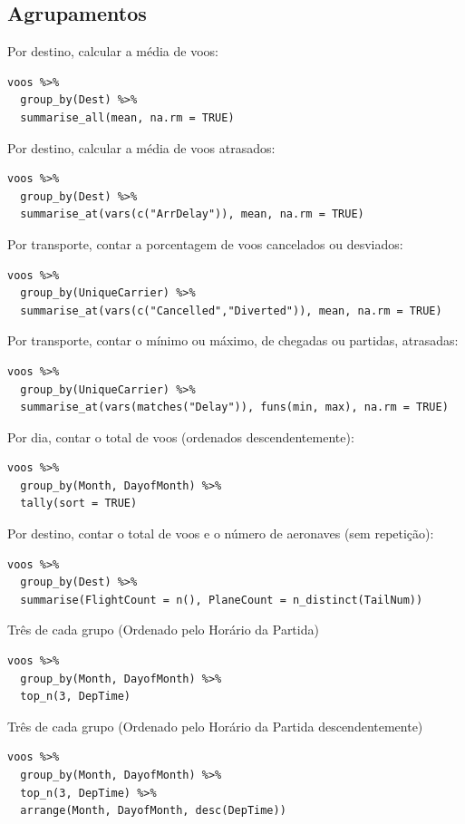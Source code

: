 \documentclass[a4paper,11pt]{article}
\begin{document}
\subsection{Agrupamentos}
Por destino, calcular a média de voos:
\begin{lstlisting}
voos %>%
  group_by(Dest) %>%
  summarise_all(mean, na.rm = TRUE)
\end{lstlisting}

Por destino, calcular a média de voos atrasados:
\begin{lstlisting}
voos %>%
  group_by(Dest) %>%
  summarise_at(vars(c("ArrDelay")), mean, na.rm = TRUE)
\end{lstlisting}

Por transporte, contar a porcentagem de voos cancelados ou desviados:
\begin{lstlisting}
voos %>%
  group_by(UniqueCarrier) %>%
  summarise_at(vars(c("Cancelled","Diverted")), mean, na.rm = TRUE)
\end{lstlisting}

Por transporte, contar o mínimo ou máximo, de chegadas ou partidas, atrasadas:
\begin{lstlisting}
voos %>%
  group_by(UniqueCarrier) %>%
  summarise_at(vars(matches("Delay")), funs(min, max), na.rm = TRUE)
\end{lstlisting}

Por dia, contar o total de voos (ordenados descendentemente):
\begin{lstlisting}
voos %>%
  group_by(Month, DayofMonth) %>%
  tally(sort = TRUE)
\end{lstlisting}

Por destino, contar o total de voos e o número de aeronaves (sem repetição):
\begin{lstlisting}
voos %>%
  group_by(Dest) %>%
  summarise(FlightCount = n(), PlaneCount = n_distinct(TailNum))
\end{lstlisting}

Três de cada grupo (Ordenado pelo Horário da Partida)
\begin{lstlisting}
voos %>% 
  group_by(Month, DayofMonth) %>% 
  top_n(3, DepTime) 
\end{lstlisting}

Três de cada grupo (Ordenado pelo Horário da Partida descendentemente)
\begin{lstlisting}
voos %>% 
  group_by(Month, DayofMonth) %>% 
  top_n(3, DepTime) %>% 
  arrange(Month, DayofMonth, desc(DepTime))
\end{lstlisting}
\end{document}
